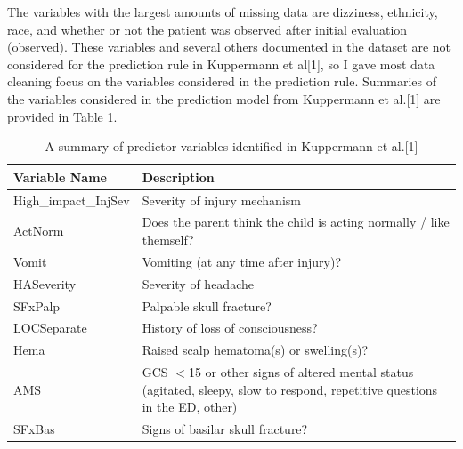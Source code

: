 \documentclass[10pt,letterpaper]{article}
\begin{document}
The variables with the largest amounts of missing data are dizziness, ethnicity, race, and whether or not the patient was observed after initial evaluation (observed). These variables and several others documented in the dataset are not considered for the prediction rule in Kuppermann et al[1], so I gave most data cleaning focus on the variables considered in the prediction rule. Summaries of the variables considered in the prediction model from Kuppermann et al.[1] are provided in Table 1.

\begin{table}[H]
\centering
\caption{A summary of predictor variables identified in Kuppermann et al.[1]}
\renewcommand{\arraystretch}{1.1} 
\begin{tabular}{|l |p{10cm}|}
\hline
\textbf{Variable Name}    & \textbf{Description}                                                                                                        \\ 
\hline
High\_impact\_InjSev& Severity of injury mechanism                                                                                                \\\hline
ActNorm              & Does the parent think the child is acting normally / like themself?                                                         \\\hline
Vomit                & Vomiting (at any time after injury)?                                                                                        \\\hline
HASeverity           & Severity of headache                                                                                                        \\\hline
SFxPalp              & Palpable skull fracture?                                                                                                    \\\hline
LOCSeparate          & History of loss of consciousness?                                                                                           \\\hline
Hema                 & Raised scalp hematoma(s) or swelling(s)?                                                                                    \\\hline
AMS                  & GCS $<$15 or other signs of altered mental status (agitated, sleepy, slow to respond, repetitive questions in the ED, other)  \\\hline
SFxBas               & Signs of basilar skull fracture?                                                                                            \\
\hline
\end{tabular}
\end{table}
\end{document}
